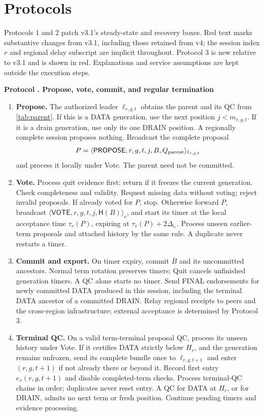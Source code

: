 \documentclass[11pt,a4paper]{article}
\newcommand{\RR}[1]{{\color{rrRed}#1}}
\newcommand{\Hash}{\mathsf H}
\newcommand{\tagg}[1]{\ensuremath{\mathsf{#1}}}
\newcounter{protocol}
\newenvironment{protocol}[2]{\refstepcounter{protocol}\label{#1}
\begin{mdframed}[nobreak=true,linewidth=.6pt,skipabove=8pt,skipbelow=8pt,
innertopmargin=7pt,innerbottommargin=7pt]\small
\textbf{Protocol \theprotocol. #2}\par\smallskip}{\end{mdframed}}
\begin{document}
\section{Protocols}
\label{sec:protocols}
Protocols 1 and 2 patch v3.1's steady-state and recovery boxes. Red text
marks substantive changes from v3.1, including those retained from v4;
the session index $r$ and regional delay subscript are implicit throughout.
Protocol 3 is new relative to v3.1 and is shown in red. Explanations and service assumptions are
kept outside the execution steps.

\begin{protocol}{alg:steady}{Propose, vote, commit, and regular termination}
\begin{enumerate}[label=\textbf{\arabic*)},itemsep=5pt]
\item \textbf{Propose.} The authorized leader $\ell_{r,g,t}$ obtains the
parent and its QC from \cref{tab:parent}. \RR{If this is a DATA generation,
use the next position $j<m_{r,g,t}$. If it is a drain generation, use only
its one DRAIN position. A regionally complete session proposes nothing.}
Broadcast the complete proposal
\[
 P=\langle\tagg{PROPOSE},r,g,t,j,B,Q_{\rm parent}\rangle_{\ell_{r,g,t}}
\]
and process it locally under Vote. The parent need not be committed.

\item \textbf{Vote.} Process quit evidence first; return if it freezes
the current generation. Check completeness and validity. Request missing
data without voting; reject invalid proposals. If already voted for $P$,
stop. Otherwise forward $P$, broadcast
\RR{$\langle\tagg{VOTE},r,g,t,j,\Hash(B)\rangle_v$}, and start its
timer at the local acceptance time $\tau_v(P)$, expiring at
\RR{$\tau_v(P)+2\Delta_{i_r}$}. Process unseen earlier-term proposals
and attached history by the same rule. A duplicate never restarts a timer.

\item \textbf{Commit and export.} On timer expiry, commit $B$ and its
uncommitted ancestors. Normal term rotation preserves timers; Quit cancels
unfinished generation timers. A QC alone starts no timer.
\RR{Send FINAL endorsements for newly committed DATA produced in this
session, including the terminal DATA ancestor of a committed DRAIN.
Relay regional receipts to peers and the cross-region infrastructure;
external acceptance is determined by Protocol 3.}

\item \textbf{Terminal QC.} On a valid term-terminal proposal QC, process
its unseen history under Vote. \RR{If it certifies DATA strictly below
$H_r$}, and the generation remains unfrozen, send its complete bundle
once to $\ell_{r,g,t+1}$ and enter $(r,g,t+1)$ if not already there or
beyond it. Record first entry $e_v(r,g,t+1)$ and disable completed-term
checks. Process terminal-QC chains in order; duplicates never reset entry.
\RR{A QC for DATA at $H_r$, or for DRAIN, admits no next term or fresh
position. Continue pending timers and evidence processing.}


\end{enumerate}
\end{protocol}
\end{document}
